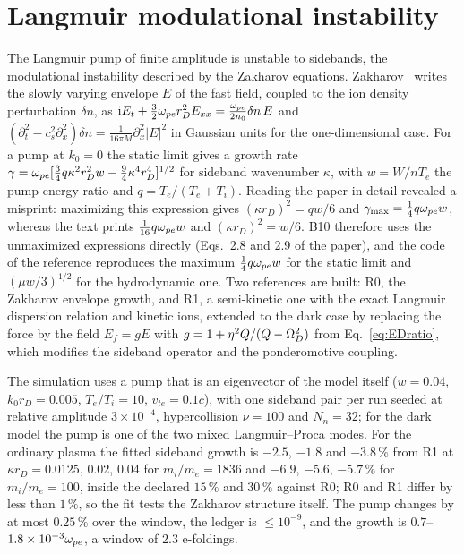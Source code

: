\section{Langmuir modulational instability}\label{sec:b10}

The Langmuir pump of finite amplitude is unstable to sidebands, the modulational instability described by the Zakharov equations. Zakharov~\cite{Zakharov1972} writes the slowly varying envelope $E$ of the fast field, coupled to the ion density perturbation $\delta n$, as $\mathrm{i} E_t+\tfrac32\omega_{pe} r_D^2E_{xx}=\tfrac{\omega_{pe}}{2n_0}\delta n\,E$ and $(\partial_t^2-c_s^2\partial_x^2)\delta n=\tfrac{1}{16\pi M}\partial_x^2|E|^2$ in Gaussian units for the one-dimensional case. For a pump at $k_0=0$ the static limit gives a growth rate $\gamma=\omega_{pe}[\tfrac34q\kappa^2r_D^2w-\tfrac94\kappa^4r_D^4]^{1/2}$ for sideband wavenumber $\kappa$, with $w=W/nT_e$ the pump energy ratio and $q=T_e/(T_e+T_i)$. Reading the paper in detail revealed a misprint: maximizing this expression gives $(\kappa r_D)^2=qw/6$ and $\gamma_{\max}=\tfrac14q\omega_{pe} w$, whereas the text prints $\tfrac1{16}q\omega_{pe} w$ and $(\kappa r_D)^2=w/6$. B10 therefore uses the unmaximized expressions directly (Eqs.~2.8 and 2.9 of the paper), and the code of the reference reproduces the maximum $\tfrac14q\omega_{pe} w$ for the static limit and $(\mu w/3)^{1/2}$ for the hydrodynamic one. Two references are built: R0, the Zakharov envelope growth, and R1, a semi-kinetic one with the exact Langmuir dispersion relation and kinetic ions, extended to the dark case by replacing the force by the field $E_f=gE$ with $g=1+\eta^2Q/(Q-\Omega_D^2)$ from Eq.~\eqref{eq:EDratio}, which modifies the sideband operator and the ponderomotive coupling.

The simulation uses a pump that is an eigenvector of the model itself ($w=0.04$, $k_0r_D=0.005$, $T_e/T_i=10$, $v_{te}=0.1c$), with one sideband pair per run seeded at relative amplitude $3\times10^{-4}$, hypercollision $\nu=100$ and $N_n=32$; for the dark model the pump is one of the two mixed Langmuir--Proca modes. For the ordinary plasma the fitted sideband growth is $-2.5$, $-1.8$ and $-3.8\,\%$ from R1 at $\kappa r_D=0.0125$, $0.02$, $0.04$ for $m_i/m_e=1836$ and $-6.9$, $-5.6$, $-5.7\,\%$ for $m_i/m_e=100$, inside the declared $15\,\%$ and $30\,\%$ against R0; R0 and R1 differ by less than $1\,\%$, so the fit tests the Zakharov structure itself. The pump changes by at most $0.25\,\%$ over the window, the ledger is $\le10^{-9}$, and the growth is $0.7$--$1.8\times10^{-3}\omega_{pe}$, a window of $2.3$ e-foldings.

